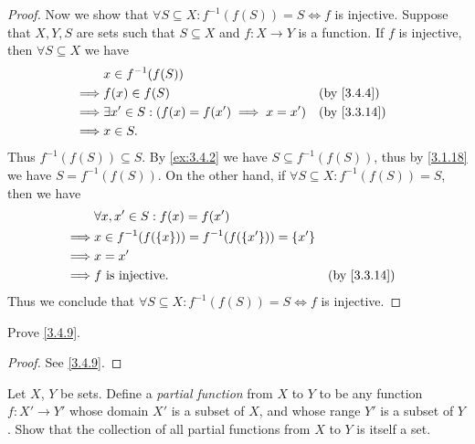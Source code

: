 \begin{proof}
  Now we show that \(\forall S \subseteq X : f^{-1}(f(S)) = S \iff f\) is injective.
  Suppose that \(X, Y, S\) are sets such that \(S \subseteq X\) and \(f : X \to Y\) is a function.
  If \(f\) is injective, then \(\forall S \subseteq X\) we have
  \begin{align*}
             & x \in f^{-1}(f(S))                                                 \\
    \implies & f(x) \in f(S)                                     &  & \by{3.4.4}  \\
    \implies & \exists x' \in S : (f(x) = f(x') \implies x = x') &  & \by{3.3.14} \\
    \implies & x \in S.
  \end{align*}
  Thus \(f^{-1}(f(S)) \subseteq S\).
  By \cref{ex:3.4.2} we have \(S \subseteq f^{-1}(f(S))\), thus by \cref{3.1.18} we have \(S = f^{-1}(f(S))\).
  On the other hand, if \(\forall S \subseteq X : f^{-1}(f(S)) = S\), then we have
  \begin{align*}
             & \forall x, x' \in S : f(x) = f(x')                                   \\
    \implies & x \in f^{-1}(f(\{x\})) = f^{-1}(f(\{x'\})) = \{x'\}                  \\
    \implies & x = x'                                                               \\
    \implies & f \text{ is injective}.                             &  & \by{3.3.14}
  \end{align*}
  Thus we conclude that \(\forall S \subseteq X : f^{-1}(f(S)) = S \iff f\) is injective.
\end{proof}

\begin{ex}\label{ex:3.4.6}
  Prove \cref{3.4.9}.
\end{ex}

\begin{proof}
  See \cref{3.4.9}.
\end{proof}

\begin{ex}\label{ex:3.4.7}
  Let \(X\), \(Y\) be sets.
  Define a \emph{partial function} from \(X\) to \(Y\) to be any function \(f : X' \to Y'\) whose domain \(X'\) is a subset of \(X\), and whose range \(Y'\) is a subset of \(Y\).
  Show that the collection of all partial functions from \(X\) to \(Y\) is itself a set.
\end{ex}

